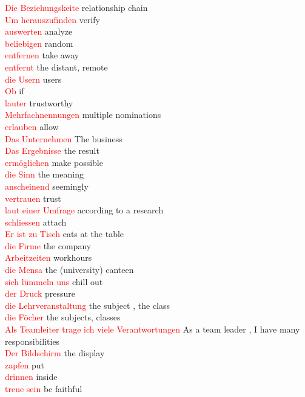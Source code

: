 \documentclass{article}
\begin{document}
\begin{multicols}{2}
	\textcolor{red}{Die Beziehungskeite} relationship chain\\
	\textcolor{red}{Um herauszufinden} verify\\
	\textcolor{red}{auswerten} analyze \\
	\textcolor{red}{beliebigen} random\\
	\textcolor{red}{entfernen} take away\\
	\textcolor{red}{entfernt}  the distant, remote\\
	\textcolor{red}{die Usern} users\\
	\textcolor{red}{Ob} if\\
	\textcolor{red}{lauter} trustworthy\\
	\textcolor{red}{Mehrfachnennungen} multiple nominations\\
	\textcolor{red}{erlauben} allow\\
	\textcolor{red}{Das Unternehmen} The business\\
	\textcolor{red}{Das Ergebnisse} the result\\
	\textcolor{red}{ermöglichen} make possible\\
	\textcolor{red}{die Sinn} the meaning\\
	\textcolor{red}{anscheinend} seemingly\\
	\textcolor{red}{vertrauen} trust\\
	\textcolor{red}{laut einer Umfrage} according to a research\\
	\textcolor{red}{schliessen} attach\\
	\textcolor{red}{Er ist zu Tisch} eats at the table\\
	\textcolor{red}{die Firme} the company\\
	\textcolor{red}{Arbeitzeiten} workhours\\
	\textcolor{red}{die Mensa} the (university) canteen\\
	\textcolor{red}{sich lümmeln uns} chill out\\
	\textcolor{red}{der Druck} pressure\\
	\textcolor{red}{die Lehrveranstaltung} the subject , the class\\
	\textcolor{red}{die Föcher} the subjects, classes\\
	\textcolor{red}{Als Teamleiter trage ich viele Verantwortungen} As a team leader , I have many responsibilities\\
	\textcolor{red}{Der Bildschirm} the display\\
	\textcolor{red}{zapfen} put\\
	\textcolor{red}{drinnen} inside\\
	\textcolor{red}{treue sein} be faithful \\\\
	

\end{multicols}
\end{document}
